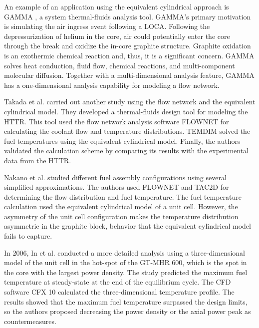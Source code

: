 An example of an application using the equivalent cylindrical approach is GAMMA \cite{lim_gamma_2006}\cite{no_multi-component_2007}, a system thermal-fluids analysis tool.
GAMMA's primary motivation is simulating the air ingress event following a LOCA.
Following the depressurization of helium in the core, air could potentially enter the core through the break and oxidize the in-core graphite structure.
Graphite oxidation is an exothermic chemical reaction and, thus, it is a significant concern.
GAMMA solves heat conduction, fluid flow, chemical reactions, and multi-component molecular diffusion.
Together with a multi-dimensional analysis feature, GAMMA has a one-dimensional analysis capability for  modeling a flow network.

Takada et al. \cite{takada_core_2004} carried out another study using the flow network and the equivalent cylindrical model.
They developed a thermal-fluids design tool for modeling the \gls{HTTR}.
This tool used the flow network analysis software FLOWNET \cite{maruyama_verification_1988} for calculating the coolant flow and temperature distributions.
TEMDIM \cite{maruyama_verification_1988} solved the fuel temperatures using the equivalent cylindrical model.
Finally, the authors validated the calculation scheme by comparing its results with the experimental data from the \gls{HTTR}.

Nakano et al. \cite{nakano_conceptual_2008} studied different fuel assembly configurations using several simplified approximations.
The authors used FLOWNET and TAC2D for determining the flow distribution and fuel temperature.
The fuel temperature calculation used the equivalent cylindrical model of a unit cell.
However, the asymmetry of the unit cell configuration makes the temperature distribution asymmetric in the graphite block, behavior that the equivalent cylindrical model fails to capture.

In 2006, In et al. \cite{in_three-dimensional_2006} conducted a more detailed analysis using a three-dimensional model of the unit cell in the hot-spot of the GT-MHR 600, which is the spot in the core with the largest power density.
The study predicted the maximum fuel temperature at steady-state at the end of the equilibrium cycle.
The \gls{CFD} software CFX 10 \cite{ansys_inc_cfx_2006} calculated the three-dimensional temperature profile.
The results showed that the maximum fuel temperature surpassed the design limits, so the authors proposed decreasing the power density or the axial power peak as countermeasures.

